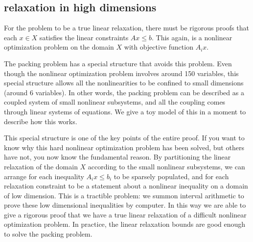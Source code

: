 \subsection{relaxation in high dimensions}


For the problem to be a true linear relaxation, there must be rigorous
proofs that each $x\in X$ satisfies the linear constraints $A x\le b$.
This again, is a nonlinear optimization problem on the domain $X$ with
objective function $A_i x$. 

The packing problem has a special structure that avoids this
problem.  Even though the nonlinear optimization problem involves
around 150 variables, 
this special structure allows all the nonlinearities to 
be confined to small dimensions (around 6 variables).  In other words,
the packing problem can be
described as a coupled system of small nonlinear subsystems,
and all the coupling comes through linear systems of equations. 
We give a toy model of this in a moment to describe how this works.

This special structure is one of the key points of the entire proof.
If you want to know why this hard nonlinear optimization problem has
been solved, but others have not, you now know the fundamental reason.
By partitioning the linear relaxation of the domain $X$ according
to the small nonlinear subsystems, we can arrange for each inequality
$A_i x\le b_i$ to be sparsely populated, and for each relaxation
constraint to be a statement about a nonlinear inequality on a domain
of low dimension.  This is a tractible problem:
we  summon interval arithmetic to prove these
low dimensional inequalities by computer.  In this way we are able
to give a rigorous proof that we have a true linear relaxation of a
difficult nonlinear optimization problem.  In practice, the linear
relaxation  bounds  are good enough to solve the packing
problem.



